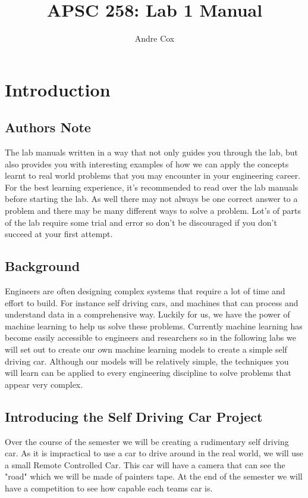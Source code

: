 \documentclass[11pt]{report}
\title{APSC 258: Lab 1 Manual}
\author{Andre Cox}
\begin{document}
    \maketitle
    \tableofcontents

    \clearpage

    \chapter{Introduction}

    \section{Authors Note}
    The lab manuals written in a way that not only guides you through the lab, but also provides you with interesting examples of how we can apply the concepts learnt to real world problems that you may encounter in your engineering career. For the best learning experience, it's recommended to read over the lab manuals before starting the lab.
    As well there may not always be one correct answer to a problem and there may be many different ways to solve a problem. Lot's of parts of the lab require some trial and error so don't be discouraged if you don't succeed at your first attempt.


    \section{Background}
    Engineers are often designing complex systems that require a lot of time and effort to build. For instance self driving cars, and machines that can process and understand data in a comprehensive way.
    Luckily for us, we have the power of machine learning to help us solve these problems. Currently machine learning has become easily accessible to engineers and researchers so in the following labs we will set out to create our own machine learning models to create a simple self driving car.
    Although our models will be relatively simple, the techniques you will learn can be applied to every engineering discipline to solve problems that appear very complex.

    \section{Introducing the Self Driving Car Project}
    Over the course of the semester we will be creating a rudimentary self driving car. As it is impractical to use a car to drive around in the real world, we will use a small Remote Controlled Car. This car will have a camera that can see the "road" which we will be made of painters tape. At the end of the semester we will have a competition to see how capable each teams car is.
\end{document}
